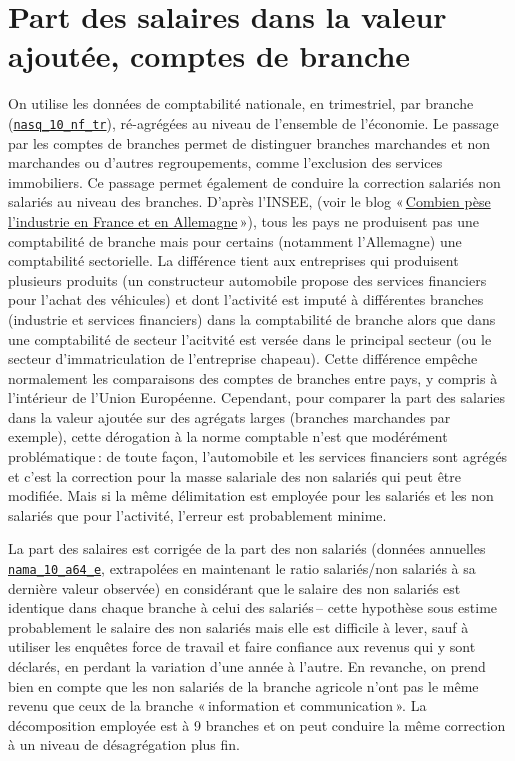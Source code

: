 \documentclass[
  french,
  9pt,
  a4paper,
]{article}
\begin{document}
\section{Part des salaires dans la valeur ajoutée, comptes de
branche}\label{part-des-salaires-dans-la-valeur-ajoutuxe9e-comptes-de-branche}

On utilise les données de comptabilité nationale, en trimestriel, par
branche
(\href{https://ec.europa.eu/eurostat/databrowser/view/nasq_10_nf_tr/default/table?lang=en}{\texttt{nasq\_10\_nf\_tr}}),
ré-agrégées au niveau de l'ensemble de l'économie. Le passage par les
comptes de branches permet de distinguer branches marchandes et non
marchandes ou d'autres regroupements, comme l'exclusion des services
immobiliers. Ce passage permet également de conduire la correction
salariés non salariés au niveau des branches. D'après l'INSEE, (voir le
blog
«\,\href{https://blog.insee.fr/combien-pese-l-industrie-en-france-et-en-allemagne/}{Combien
pèse l'industrie en France et en Allemagne}\,»), tous les pays ne
produisent pas une comptabilité de branche mais pour certains (notamment
l'Allemagne) une comptabilité sectorielle. La différence tient aux
entreprises qui produisent plusieurs produits (un constructeur
automobile propose des services financiers pour l'achat des véhicules)
et dont l'activité est imputé à différentes branches (industrie et
services financiers) dans la comptabilité de branche alors que dans une
comptabilité de secteur l'acitvité est versée dans le principal secteur
(ou le secteur d'immatriculation de l'entreprise chapeau). Cette
différence empêche normalement les comparaisons des comptes de branches
entre pays, y compris à l'intérieur de l'Union Européenne. Cependant,
pour comparer la part des salaries dans la valeur ajoutée sur des
agrégats larges (branches marchandes par exemple), cette dérogation à la
norme comptable n'est que modérément problématique\,: de toute façon,
l'automobile et les services financiers sont agrégés et c'est la
correction pour la masse salariale des non salariés qui peut être
modifiée. Mais si la même délimitation est employée pour les salariés et
les non salariés que pour l'activité, l'erreur est probablement minime.

La part des salaires est corrigée de la part des non salariés (données
annuelles
\href{https://ec.europa.eu/eurostat/databrowser/view/nama_10_a64_e/default/table?lang=en}{\texttt{nama\_10\_a64\_e}},
extrapolées en maintenant le ratio salariés/non salariés à sa dernière
valeur observée) en considérant que le salaire des non salariés est
identique dans chaque branche à celui des salariés\,-- cette hypothèse
sous estime probablement le salaire des non salariés mais elle est
difficile à lever, sauf à utiliser les enquêtes force de travail et
faire confiance aux revenus qui y sont déclarés, en perdant la variation
d'une année à l'autre. En revanche, on prend bien en compte que les non
salariés de la branche agricole n'ont pas le même revenu que ceux de la
branche «\,information et communication\,». La décomposition employée
est à 9 branches et on peut conduire la même correction à un niveau de
désagrégation plus fin.
\end{document}
